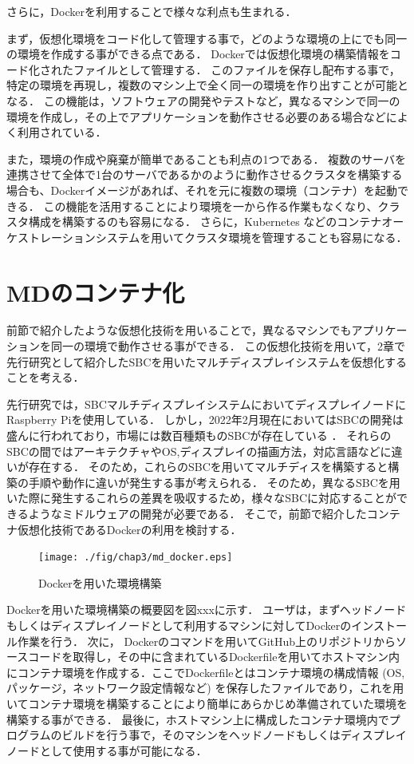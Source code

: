 さらに，Dockerを利用することで様々な利点も生まれる．

まず，仮想化環境をコード化して管理する事で，どのような環境の上にでも同一の環境を作成する事ができる点である．
Dockerでは仮想化環境の構築情報をコード化されたファイルとして管理する．
このファイルを保存し配布する事で，特定の環境を再現し，複数のマシン上で全く同一の環境を作り出すことが可能となる．
この機能は，ソフトウェアの開発やテストなど，異なるマシンで同一の環境を作成し，その上でアプリケーションを動作させる必要のある場合などによく利用されている．

また，環境の作成や廃棄が簡単であることも利点の1つである．
複数のサーバを連携させて全体で1台のサーバであるかのように動作させるクラスタを構築する場合も、Dockerイメージがあれば、それを元に複数の環境（コンテナ）を起動できる．
この機能を活用することにより環境を一から作る作業もなくなり、クラスタ構成を構築するのも容易になる．
さらに，Kubernetes \cite{k8s}などのコンテナオーケストレーションシステムを用いてクラスタ環境を管理することも容易になる．



\section{MDのコンテナ化}
前節で紹介したような仮想化技術を用いることで，異なるマシンでもアプリケーションを同一の環境で動作させる事ができる．
この仮想化技術を用いて，2章で先行研究として紹介したSBCを用いたマルチディスプレイシステムを仮想化することを考える．

先行研究では，SBCマルチディスプレイシステムにおいてディスプレイノードにRaspberry Piを使用している．
しかし，2022年2月現在においてはSBCの開発は盛んに行われており，市場には数百種類ものSBCが存在している \cite{hackerbords}．
それらのSBCの間ではアーキテクチャやOS,ディスプレイの描画方法，対応言語などに違いが存在する．
そのため，これらのSBCを用いてマルチディスを構築すると構築の手順や動作に違いが発生する事が考えられる．
そのため，異なるSBCを用いた際に発生するこれらの差異を吸収するため，様々なSBCに対応することができるようなミドルウェアの開発が必要である．
そこで，前節で紹介したコンテナ仮想化技術であるDockerの利用を検討する．

\begin{figure}[H]
    \hspace*{\fill}
    \texttt{[image: ./fig/chap3/md\_docker.eps]}
    \hspace*{\fill}
    \caption{Dockerを用いた環境構築}
\end{figure}

Dockerを用いた環境構築の概要図を図xxxに示す．
ユーザは，まずヘッドノードもしくはディスプレイノードとして利用するマシンに対してDockerのインストール作業を行う．
次に， Dockerのコマンドを用いてGitHub上のリポジトリからソースコードを取得し，その中に含まれているDockerfileを用いてホストマシン内にコンテナ環境を作成する．ここでDockerfileとはコンテナ環境の構成情報 (OS, パッケージ，ネットワーク設定情報など) を保存したファイルであり，これを用いてコンテナ環境を構築することにより簡単にあらかじめ準備されていた環境を構築する事ができる．
最後に，ホストマシン上に構成したコンテナ環境内でプログラムのビルドを行う事で，そのマシンをヘッドノードもしくはディスプレイノードとして使用する事が可能になる．

